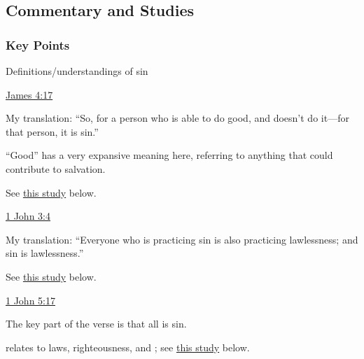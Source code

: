 	
	
\subsection{Commentary and Studies} %
	\label{SIN-COMMENTARY}
	
	\subsubsection{Key Points}
		\label{SIN-KEYS}
	
		\begin{compactitem}
			\item Definitions/understandings of sin
				\begin{compactitem}
					\item \hyperref[JAMES-4-17]{James 4:17}
						\begin{compactitem}
							\item My translation: ``So, for a person who is able to do good, and doesn't do it---for that person, it is sin.''
							\item ``Good'' has a very expansive meaning here, referring to anything that could contribute to salvation.
							\item See \hyperref[SIN-james-4-17]{this study} below.
						\end{compactitem}
					\item \hyperref[1JOHN-3-4]{1 John 3:4}
						\begin{compactitem}
							\item My translation: ``Everyone who is practicing sin is also practicing lawlessness; and sin is lawlessness.''
							\item See \hyperref[SIN-1john-3-4]{this study} below.
						\end{compactitem}
					\item \hyperref[1JOHN-5-17]{1 John 5:17}
						\begin{compactitem}
							\item The key part of the verse is that all  is sin.
							\item {} relates to laws, righteousness, and ; see \hyperref[SIN-1john-5-17]{this study} below.
						\end{compactitem}
				\end{compactitem}
		\end{compactitem}
	
